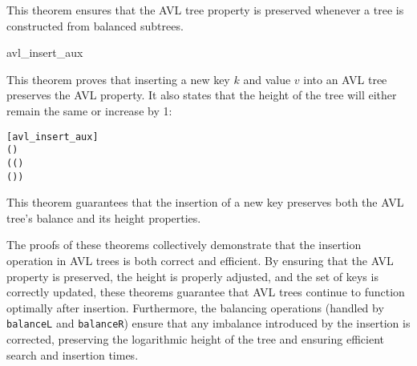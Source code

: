 This theorem ensures that the AVL tree property is preserved whenever a tree is constructed from balanced subtrees.

\begin{thm}{avl\_insert\_aux}

This theorem proves that inserting a new key \(k\) and value \(v\) into an AVL tree preserves the AVL property. It also states that the height of the tree will either remain the same or increase by 1:


\begin{alltt}
	[avl_insert_aux]
	\HOLTokenTurnstile{}   \HOLSymConst{\HOLTokenImp{}}
    (   ) \HOLSymConst{\HOLTokenConj{}}
   ( (   ) \HOLSymConst{=}   \HOLSymConst{\HOLTokenDisj{}}
     (   ) \HOLSymConst{=}   \HOLSymConst{\ensuremath{+}} )
\end{alltt}

\end{thm}

This theorem guarantees that the insertion of a new key preserves both the AVL tree’s balance and its height properties.

The proofs of these theorems collectively demonstrate that the insertion operation in AVL trees is both correct and efficient. By ensuring that the AVL property is preserved, the height is properly adjusted, and the set of keys is correctly updated, these theorems guarantee that AVL trees continue to function optimally after insertion. Furthermore, the balancing operations (handled by \texttt{balanceL} and \texttt{balanceR}) ensure that any imbalance introduced by the insertion is corrected, preserving the logarithmic height of the tree and ensuring efficient search and insertion times.